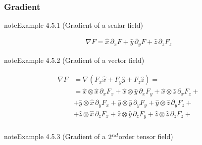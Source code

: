 \documentclass[letterpaper,10pt,english]{jupyterBook}
\begin{document}
\subsubsection{Gradient}
\label{\detokenize{ch/tensor-algebra-calculus/calculus-euclidean-cartesian:gradient}}\label{\detokenize{ch/tensor-algebra-calculus/calculus-euclidean-cartesian:tensor-calculus-cartesian-differential-operators-gradient}}\label{ch/tensor-algebra-calculus/calculus-euclidean-cartesian:example-0}
\begin{sphinxadmonition}{note}{Example 4.5.1 (Gradient of a scalar field)}


\begin{equation*}
\begin{split}\nabla F = \hat{x} \, \partial_x F + \hat{y} \, \partial_y F + \hat{z} \, \partial_z F_z\end{split}
\end{equation*}\end{sphinxadmonition}
\label{ch/tensor-algebra-calculus/calculus-euclidean-cartesian:example-1}
\begin{sphinxadmonition}{note}{Example 4.5.2 (Gradient of a vector field)}


\begin{equation*}
\begin{split}\begin{aligned}
\nabla F 
  & = \nabla (F_x \hat{x} + F_y \hat{y} + F_z \hat{z}) = \\
  & = \hat{x} \otimes \hat{x} \, \partial_x F_x + \hat{x} \otimes \hat{y} \, \partial_x F_y + \hat{x} \otimes \hat{z} \, \partial_x F_z + \\
  & + \hat{y} \otimes \hat{x} \, \partial_y F_x + \hat{y} \otimes \hat{y} \, \partial_y F_y + \hat{y} \otimes \hat{z} \, \partial_y F_z + \\
  & + \hat{z} \otimes \hat{x} \, \partial_z F_x + \hat{z} \otimes \hat{y} \, \partial_z F_y + \hat{z} \otimes \hat{z} \, \partial_z F_z + \\
\end{aligned}\end{split}
\end{equation*}\end{sphinxadmonition}
\label{ch/tensor-algebra-calculus/calculus-euclidean-cartesian:example-2}
\begin{sphinxadmonition}{note}{Example 4.5.3 (Gradient of a \protect\(2^{nd}\protect\)\sphinxhyphen{}order tensor field)}


\end{sphinxadmonition}
\end{document}
